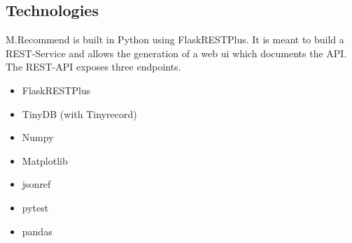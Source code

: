 \subsection{Technologies}

M.Recommend is built in Python using FlaskRESTPlus. It is meant to build a REST-Service and allows the generation of a web ui which documents the API. The REST-API exposes three endpoints.

\begin{itemize}
    \item FlaskRESTPlus
    \item TinyDB (with Tinyrecord)
    \item Numpy
    \item Matplotlib
    \item jsonref
    \item pytest
    \item pandas
\end{itemize}